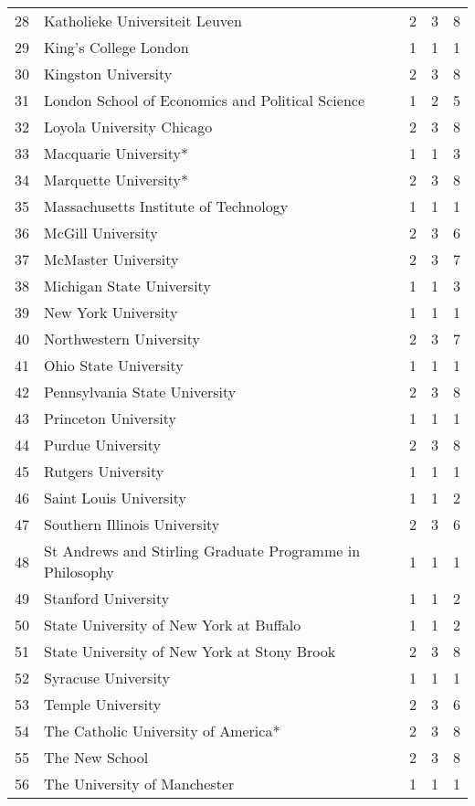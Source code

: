 \begin{table}[ht]
\begin{tabular}{rllll}
  28 & Katholieke Universiteit Leuven & 2 & 3 & 8 \\ 
  29 & King's College London & 1 & 1 & 1 \\ 
  30 & Kingston University & 2 & 3 & 8 \\ 
  31 & London School of Economics and Political Science & 1 & 2 & 5 \\ 
  32 & Loyola University Chicago & 2 & 3 & 8 \\ 
  33 & Macquarie University* & 1 & 1 & 3 \\ 
  34 & Marquette University* & 2 & 3 & 8 \\ 
  35 & Massachusetts Institute of Technology & 1 & 1 & 1 \\ 
  36 & McGill University & 2 & 3 & 6 \\ 
  37 & McMaster University & 2 & 3 & 7 \\ 
  38 & Michigan State University & 1 & 1 & 3 \\ 
  39 & New York University & 1 & 1 & 1 \\ 
  40 & Northwestern University & 2 & 3 & 7 \\ 
  41 & Ohio State University & 1 & 1 & 1 \\ 
  42 & Pennsylvania State University & 2 & 3 & 8 \\ 
  43 & Princeton University & 1 & 1 & 1 \\ 
  44 & Purdue University & 2 & 3 & 8 \\ 
  45 & Rutgers University & 1 & 1 & 1 \\ 
  46 & Saint Louis University & 1 & 1 & 2 \\ 
  47 & Southern Illinois University & 2 & 3 & 6 \\ 
  48 & St Andrews and Stirling Graduate Programme in Philosophy & 1 & 1 & 1 \\ 
  49 & Stanford University & 1 & 1 & 2 \\ 
  50 & State University of New York at Buffalo & 1 & 1 & 2 \\ 
  51 & State University of New York at Stony Brook & 2 & 3 & 8 \\ 
  52 & Syracuse University & 1 & 1 & 1 \\ 
  53 & Temple University & 2 & 3 & 6 \\ 
  54 & The Catholic University of America* & 2 & 3 & 8 \\ 
  55 & The New School & 2 & 3 & 8 \\ 
  56 & The University of Manchester & 1 & 1 & 1 \\ 

\end{tabular}
\end{table}
